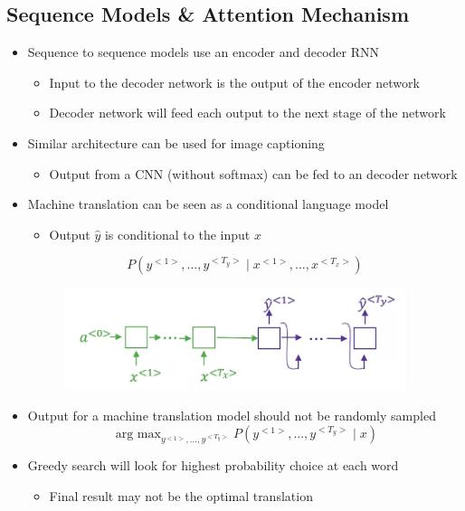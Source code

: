 \documentclass[12pt, letterpaper]{article}
\begin{document}
    \subsection{Sequence Models \& Attention Mechanism}
    \begin{itemize}
        \item Sequence to sequence models use an encoder and decoder RNN
        \begin{itemize}
            \item Input to the decoder network is the output of the encoder network
            \item Decoder network will feed each output to the next stage of the network
        \end{itemize}
        \item Similar architecture can be used for image captioning
        \begin{itemize}
            \item Output from a CNN (without softmax) can be fed to an decoder network
        \end{itemize}
        \item Machine translation can be seen as a conditional language model
        \begin{itemize}
            \item Output $\hat{y}$ is conditional to the input $x$  
        \end{itemize}
        $$P(y^{<1>},...,y^{<T_y>}\mid x^{<1>},...,x^{<T_x>})$$
        \begin{figure}[ht]
            \centering
            \includegraphics[width=10cm]{35.png}
        \end{figure}
        \item Output for a machine translation model should not be randomly sampled
        $$\mathop{\text{arg max}}_{y^{<1>},...,y^{<T_y>}}P(y^{<1>},...,y^{<T_y>}\mid x)$$
        \item Greedy search will look for highest probability choice at each word
        \begin{itemize}
            \item Final result may not be the optimal translation 
        \end{itemize}

\end{itemize}
\end{document}
